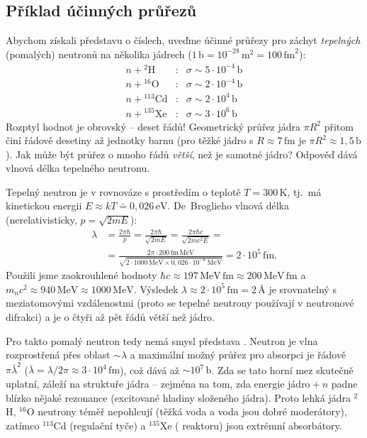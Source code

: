 \subsection{Příklad účinných průřezů}

Abychom získali představu o číslech, uveďme účinné průřezy pro záchyt
\emph{tepelných} (pomalých) neutronů na několika jádrech
(\(1\,\mathrm{b} = 10^{-28}\,\mathrm{m}^2 = 100\,\mathrm{fm}^2\)):
\[
\begin{array}{lcl}
  n + {}^{2}\mathrm{H}   &:& \sigma \sim 5\cdot10^{-4}\,\mathrm{b} \\
  n + {}^{16}\mathrm{O}  &:& \sigma \sim 2\cdot10^{-4}\,\mathrm{b} \\
  n + {}^{113}\mathrm{Cd} &:& \sigma \sim 2\cdot10^{4}\,\mathrm{b} \\
  n + {}^{135}\mathrm{Xe} &:& \sigma \sim 3\cdot10^{6}\,\mathrm{b}
\end{array}
\]
Rozptyl hodnot je obrovský -- deset řádů! Geometrický průřez jádra
\(\pi R^2\) přitom činí řádově desetiny až jednotky barnu (pro těžké jádro
s \(R\approx 7\,\mathrm{fm}\) je \(\pi R^2\approx 1{,}5\,\mathrm{b}\)). Jak
může být průřez o mnoho řádů \emph{větší}, než je samotné jádro? Odpověď
dává vlnová délka tepelného neutronu.

\begin{priklad}
Tepelný neutron je v rovnováze s prostředím o teplotě \(T = 300\,\mathrm{K}\),
tj.\ má kinetickou energii \(E\approx kT \doteq 0{,}026\,\mathrm{eV}\).
De~Broglieho vlnová délka (nerelativisticky, \(p=\sqrt{2mE}\)):
\begin{align*}
  \lambda &= \frac{2\pi\hbar}{p} = \frac{2\pi\hbar}{\sqrt{2mE}}
           = \frac{2\pi\hbar c}{\sqrt{2mc^2E}} = \\
          &= \frac{2\pi\cdot 200\,\mathrm{fm\,MeV}}{\sqrt{2\cdot 1000\,\mathrm{MeV}\times 0{,}026\cdot10^{-6}\,\mathrm{MeV}}}
           = 2\cdot10^{5}\,\mathrm{fm} .
\end{align*}
Použili jsme zaokrouhlené hodnoty \(\hbar c\approx 197\,\mathrm{MeV\,fm}
\approx 200\,\mathrm{MeV\,fm}\) a \(m_nc^2\approx 940\,\mathrm{MeV}\approx
1000\,\mathrm{MeV}\). Výsledek \(\lambda\approx 2\cdot10^5\,\mathrm{fm} = 2\,
\text{Å}\) je srovnatelný s meziatomovými vzdálenostmi (proto se tepelné
neutrony používají v neutronové difrakci) a je o čtyři až pět řádů větší
než jádro.
\end{priklad}

Pro takto pomalý neutron tedy nemá smysl představa . Neutron je vlna rozprostřená přes oblast
\(\sim\lambda\) a maximální možný průřez pro absorpci je řádově
\(\pi\bar\lambda^2\) (\(\bar\lambda=\lambda/2\pi\approx3\cdot10^4\,\mathrm{fm}\)),
což dává až \(\sim10^7\,\mathrm{b}\). Zda se tato horní mez skutečně
uplatní, záleží na struktuře jádra -- zejména na tom, zda energie
\(\text{jádro}+n\) padne blízko nějaké rezonance (excitované hladiny
složeného jádra). Proto lehká jádra \({}^{2}\)H, \({}^{16}\)O neutrony téměř
nepohlcují (těžká voda a voda jsou dobré moderátory), zatímco
\({}^{113}\)Cd (regulační tyče) a \({}^{135}\)Xe (
reaktoru) jsou extrémní absorbátory.

